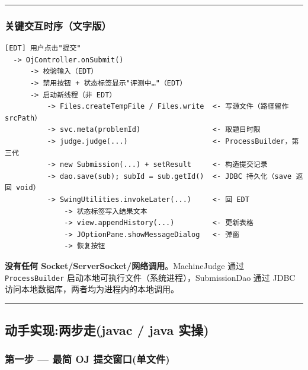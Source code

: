 \documentclass[
  11pt,
]{ctexart}
\begin{document}
\begin{center}\rule{0.5\linewidth}{0.5pt}\end{center}

\hypertarget{ux5173ux952eux4ea4ux4e92ux65f6ux5e8fux6587ux5b57ux7248}{%
\subsubsection{关键交互时序（文字版）}\label{ux5173ux952eux4ea4ux4e92ux65f6ux5e8fux6587ux5b57ux7248}}

\begin{verbatim}
[EDT] 用户点击"提交"
  -> OjController.onSubmit()
      -> 校验输入（EDT）
      -> 禁用按钮 + 状态标签显示"评测中…"（EDT）
      -> 启动新线程（非 EDT）
          -> Files.createTempFile / Files.write  <- 写源文件（路径留作 srcPath）
          -> svc.meta(problemId)                 <- 取题目时限
          -> judge.judge(...)                    <- ProcessBuilder，第三代
          -> new Submission(...) + setResult     <- 构造提交记录
          -> dao.save(sub); subId = sub.getId()  <- JDBC 持久化（save 返回 void）
          -> SwingUtilities.invokeLater(...)     <- 回 EDT
              -> 状态标签写入结果文本
              -> view.appendHistory(...)         <- 更新表格
              -> JOptionPane.showMessageDialog   <- 弹窗
              -> 恢复按钮
\end{verbatim}

\textbf{没有任何 Socket/ServerSocket/网络调用}。MachineJudge 通过
\texttt{ProcessBuilder} 启动本地可执行文件（系统进程），SubmissionDao
通过 JDBC 访问本地数据库，两者均为进程内的本地调用。

\begin{center}\rule{0.5\linewidth}{0.5pt}\end{center}

\hypertarget{ux52a8ux624bux5b9eux73b0ux4e24ux6b65ux8d70javac-java-ux5b9eux64cd-5}{%
\subsection{动手实现:两步走(javac / java
实操)}\label{ux52a8ux624bux5b9eux73b0ux4e24ux6b65ux8d70javac-java-ux5b9eux64cd-5}}

\hypertarget{ux7b2cux4e00ux6b65-ux6700ux7b80-oj-ux63d0ux4ea4ux7a97ux53e3ux5355ux6587ux4ef6}{%
\subsubsection{\texorpdfstring{第一步 \KS --- 最简 OJ
提交窗口(单文件)}{第一步 --- 最简 OJ 提交窗口(单文件)}}\label{ux7b2cux4e00ux6b65-ux6700ux7b80-oj-ux63d0ux4ea4ux7a97ux53e3ux5355ux6587ux4ef6}}
\end{document}
